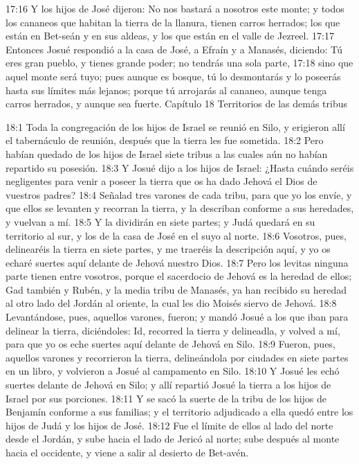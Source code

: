 17:16 Y los hijos de José dijeron: No nos bastará a nosotros este monte; y todos los cananeos que habitan la tierra de la llanura, tienen carros herrados; los que están en Bet-seán y en sus aldeas, y los que están en el valle de Jezreel.  
17:17 Entonces Josué respondió a la casa de José, a Efraín y a Manasés, diciendo: Tú eres gran pueblo, y tienes grande poder; no tendrás una sola parte,  
17:18 sino que aquel monte será tuyo; pues aunque es bosque, tú lo desmontarás y lo poseerás hasta sus límites más lejanos; porque tú arrojarás al cananeo, aunque tenga carros herrados, y aunque sea fuerte.  
Capítulo 18
Territorios de las demás tribus  

18:1 Toda la congregación de los hijos de Israel se reunió en Silo, y erigieron allí el tabernáculo de reunión, después que la tierra les fue sometida.  
18:2 Pero habían quedado de los hijos de Israel siete tribus a las cuales aún no habían repartido su posesión.  
18:3 Y Josué dijo a los hijos de Israel: ¿Hasta cuándo seréis negligentes para venir a poseer la tierra que os ha dado Jehová el Dios de vuestros padres?  
18:4 Señalad tres varones de cada tribu, para que yo los envíe, y que ellos se levanten y recorran la tierra, y la describan conforme a sus heredades, y vuelvan a mí.  
18:5 Y la dividirán en siete partes; y Judá quedará en su territorio al sur, y los de la casa de José en el suyo al norte.  
18:6 Vosotros, pues, delinearéis la tierra en siete partes, y me traeréis la descripción aquí, y yo os echaré suertes aquí delante de Jehová nuestro Dios.  
18:7 Pero los levitas ninguna parte tienen entre vosotros, porque el sacerdocio de Jehová es la heredad de ellos; Gad también y Rubén, y la media tribu de Manasés, ya han recibido su heredad al otro lado del Jordán al oriente, la cual les dio Moisés siervo de Jehová.  
18:8 Levantándose, pues, aquellos varones, fueron; y mandó Josué a los que iban para delinear la tierra, diciéndoles: Id, recorred la tierra y delineadla, y volved a mí, para que yo os eche suertes aquí delante de Jehová en Silo.  
18:9 Fueron, pues, aquellos varones y recorrieron la tierra, delineándola por ciudades en siete partes en un libro, y volvieron a Josué al campamento en Silo.  
18:10 Y Josué les echó suertes delante de Jehová en Silo; y allí repartió Josué la tierra a los hijos de Israel por sus porciones.  
18:11 Y se sacó la suerte de la tribu de los hijos de Benjamín conforme a sus familias; y el territorio adjudicado a ella quedó entre los hijos de Judá y los hijos de José.  
18:12 Fue el límite de ellos al lado del norte desde el Jordán, y sube hacia el lado de Jericó al norte; sube después al monte hacia el occidente, y viene a salir al desierto de Bet-avén.  
